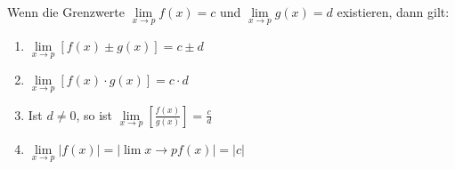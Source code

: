 Wenn die Grenzwerte $\lim\limits_{x \to p} f(x) = c$ und $\lim\limits_{x \to p} g(x) = d$ existieren, dann gilt:
\begin{enumerate}
    \item $\lim\limits_{x \to p} [f(x) \pm g(x)] = c \pm d$
    \item $\lim\limits_{x \to p} [f(x) \cdot g(x)] = c \cdot d$
    \item Ist $d \neq 0$, so ist $\lim\limits_{x \to p} \left[\frac{f(x)}{g(x)}\right] = \frac{c}{d}$
    \item $\lim\limits_{x \to p} |f(x)| = |\lim\limits{x \to p} f(x)| = |c|$
\end{enumerate}